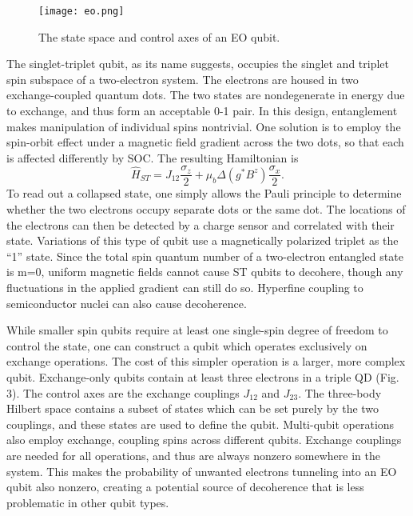 \documentclass[aps,prl,twocolumn,superscriptaddress,groupedaddress]{revtex4}
\begin{document}
\begin{figure}
\label{eofig}
\texttt{[image: eo.png]}
\caption{\label{eofig}The state space and control axes of an EO qubit\cite{burkard_semiconductor_2021}.}
\end{figure}

The singlet-triplet qubit, as its name suggests, occupies the singlet and triplet spin subspace of a two-electron system. The electrons are housed in two exchange-coupled quantum dots. The two states are nondegenerate in energy due to exchange, and thus form an acceptable 0-1 pair. In this design, entanglement makes manipulation of individual spins nontrivial. One solution is to employ the spin-orbit effect under a magnetic field gradient across the two dots, so that each is affected differently by SOC.  The resulting Hamiltonian is
\begin{equation}
\hat{H}_{ST}=J_{12}\frac{\sigma_z}{2}+\mu_b \Delta \left(g^{*}B^{z}\right)\frac{\sigma_x}{2}.
\end{equation}
To read out a collapsed state, one simply allows the Pauli principle to determine whether the two electrons occupy separate dots or the same dot. The locations of the electrons can then be detected by a charge sensor and correlated with their state. Variations of this type of qubit use a magnetically polarized triplet as the “1” state. Since the total spin quantum number of a two-electron entangled state is m=0, uniform magnetic fields cannot cause ST qubits to decohere, though any fluctuations in the applied gradient can still do so. Hyperfine coupling to semiconductor nuclei can also cause decoherence.

While smaller spin qubits require at least one single-spin degree of freedom to control the state, one can construct a qubit which operates exclusively on exchange operations. The cost of this simpler operation is a larger, more complex qubit. Exchange-only qubits contain at least three electrons in a triple QD (Fig. 3). The control axes are the exchange couplings $J_{12} $ and $J_{23}$. The three-body Hilbert space contains a subset of states which can be set purely by the two couplings, and these states are used to define the qubit. Multi-qubit operations also employ exchange, coupling spins across different qubits. Exchange couplings are needed for all operations, and thus are always nonzero somewhere in the system. This makes the probability of unwanted electrons tunneling into an EO qubit  also nonzero, creating a potential source of decoherence that is less problematic in other qubit types.
\end{document}
